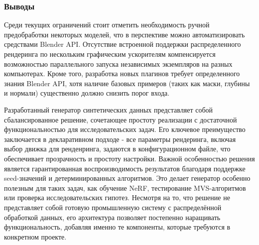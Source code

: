 \subsubsection*{Выводы}

Среди текущих ограничений стоит отметить необходимость ручной предобработки
некоторых моделей, что в перспективе можно автоматизировать средствами Blender
API. Отсутствие встроенной поддержки распределенного рендеринга по нескольким
графическим ускорителям компенсируется возможностью параллельного запуска
независимых экземпляров на разных компьютерах. Кроме того, разработка новых
плагинов требует определенного знания Blender API, хотя наличие базовых примеров
(таких как маски, глубины и нормали) существенно должно снизить порог входа.

Разработанный генератор синтетических данных представляет собой сбалансированное
решение, сочетающее простоту реализации с достаточной функциональностью для
исследовательских задач. Его ключевое преимущество заключается в декларативном
подходе - все параметры рендеринга, включая выбор движка для ренденринга,
задаются в конфигурационном файле, что обеспечивает прозрачность и простоту
настройки. Важной особенностью решения является гарантированная воспроизводимость
результатов благодаря поддержке seed-значений и детерминированных алгоритмов.
Это делает генератор особенно полезным для таких задач, как обучение NeRF,
тестирование MVS-алгоритмов или проверка исследовательских гипотез.
Несмотря на то, что решение не представляет собой готовую промышленную систему с
распределённой обработкой данных, его архитектура позволяет постепенно
наращивать функциональность, добавляя именно те компоненты, которые требуются в
конкретном проекте.
